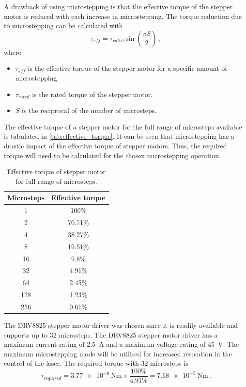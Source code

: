 A drawback of using microstepping is that the effective torque of the stepper motor is reduced with each increase in microstepping. The torque reduction due to microstepping can be calculated with
\begin{equation}
  \tau_{eff} = \tau_{rated} \sin \left(\frac{\pi S}{2}\right)\,,
\end{equation}
where
\begin{itemize}
  \item $\tau_{eff}$ is the effective torque of the stepper motor for a specific amount of microstepping.
  \item $\tau_{rated}$ is the rated torque of the stepper motor.
  \item $S$ is the reciprocal of the number of microsteps.
\end{itemize}

The effective torque of a stepper motor for the full range of microsteps available is tabulated in \autoref{tab:effective_torque}. It can be seen that microstepping has a drastic impact of the effective torque of stepper motors. Thus, the required torque will need to be calculated for the chosen microstepping operation.
\begin{table}[h]
  \centering
  \begin{tabular}{|c|c|}
    \hline
    Microsteps & Effective torque \\
    \hline
    1          & 100\%            \\
    2          & 70.71\%          \\
    4          & 38.27\%          \\
    8          & 19.51\%          \\
    16         & 9.8\%            \\
    32         & 4.91\%           \\
    64         & 2.45\%           \\
    128        & 1.23\%           \\
    256        & 0.61\%           \\
    \hline
  \end{tabular}
  \caption{Effective torque of stepper motor for full range of microsteps.}
  \label{tab:effective_torque}
\end{table}

The DRV8825 stepper motor driver was chosen since it is readily available and supports up to 32 microsteps. The DRV8825 stepper motor driver has a maximum current rating of 2.5~A and a maximum voltage rating of 45~V. The maximum microstepping mode will be utilised for increased resolution in the control of the laser. The required torque with 32 microsteps is
\begin{equation}
  \tau_{required} = \SI{3.77e-6}{\newton\meter} \times \frac{100\%}{4.91\%} = \SI{7.68e-5}{\newton\meter}\,.
\end{equation}

